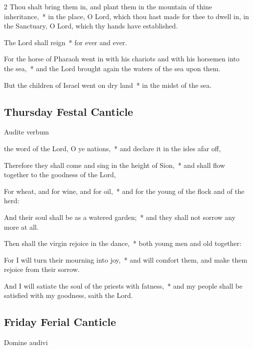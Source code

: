 \begin{multicols}{2}
Thou shalt bring them in, and plant them in the mountain of thine inheritance,~* in the place, O Lord, which thou hast made for thee to dwell in, in the Sanctuary, O Lord, which thy hands have established.\par
The Lord shall reign~* for ever and ever.\par
For the horse of Pharaoh went in with his chariots and with his horsemen into the sea,~* and the Lord brought again the waters of the sea upon them.\par
But the children of Israel went on dry land~* in the midst of the sea.

\subsection{Thursday Festal Canticle}

\begin{inhead}
Audite verbum
\end{inhead}

 the word of the Lord, O ye nations,~* and declare it in the isles afar off,\par
{}
Therefore they shall come and sing in the height of Sion,~* and shall flow together to the goodness of the Lord,\par
For wheat, and for wine, and for oil,~* and for the young of the flock and of the herd:\par
And their soul shall be as a watered garden;~* and they shall not sorrow any more at all.\par
Then shall the virgin rejoice in the dance,~* both young men and old together:\par
For I will turn their mourning into joy,~* and will comfort them, and make them rejoice from their sorrow.\par
And I will satiate the soul of the priests with fatness,~* and my people shall be satisfied with my goodness, saith the Lord.

\subsection{Friday Ferial Canticle}

\begin{inhead}
Domine audivi
\end{inhead}


\end{multicols}
